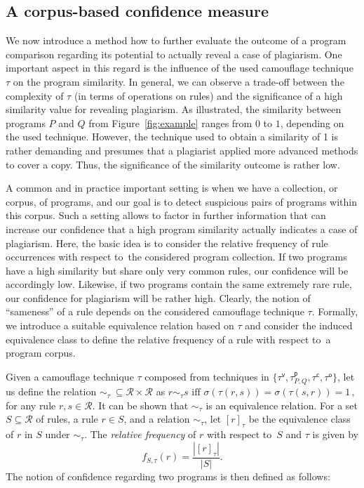\documentclass{tlp}
\newcommand{\camouv}{\tau^\mathsf{v}}
\newcommand{\camoup}{\tau^\mathsf{p}}
\newcommand{\camouc}{\tau^\mathsf{c}}
\newcommand{\camouo}{\tau^\mathsf{o}}
\newcommand{\wrt}[0]{with respect to}
\newcommand{\rules}{\mathcal{R}}
\begin{document}
\subsection{A corpus-based confidence measure}


We now introduce a method how to further evaluate the outcome of a program comparison regarding its
potential to actually reveal a  case of plagiarism.
One important aspect in this regard is the influence of the used camouflage technique $\tau$ on the program similarity.
In general,
we can observe a trade-off between the complexity of $\tau$ (in terms of operations on rules) and
the significance of a high similarity value for revealing plagiarism. 
As illustrated, the similarity between programs $P$ and $Q$ from Figure~\ref{fig:example} ranges from $0$ to $1$, depending on the used technique.
However, the technique used to obtain a similarity of 1 is rather demanding and presumes that 
a plagiarist applied more advanced methods to cover a copy.
Thus, the significance of the similarity outcome is rather low.

A common and in practice important setting  is when we have a collection, or corpus, of programs, and our goal is
to detect suspicious pairs of programs within this corpus.  Such a setting allows to factor in further information
that can increase our confidence that a high program similarity actually indicates a case of plagiarism.  
Here, the basic idea is to consider the relative frequency of rule occurrences \wrt\ the considered program collection.
If two programs have a high similarity but share only very common rules, our confidence 
will be accordingly low. 
Likewise, if two programs contain the same extremely rare rule,
our confidence for plagiarism will be rather high.
Clearly, the notion of ``sameness'' of a rule depends on the considered camouflage technique $\tau$.
Formally, we introduce a suitable equivalence relation based on $\tau$  and consider the induced equivalence class to define the relative frequency of a rule \wrt\ a program corpus.

Given a camouflage technique $\tau$   composed from techniques in $\{\camouv, \camoup_{P,Q}, \camouc, \camouo\}$, let us
define the  relation $\sim_{\tau}\ \subseteq \rules \times \rules$ as 
$
r \sim_{\tau} s \mbox{ iff }  \sigma(\tau(r,s)) =  \sigma(\tau(s,r)) =  1\,,
$
for any rule $r,s \in \rules$.
It can be shown that  $\sim_{\tau}$ is an equivalence relation.
For a set $S \subseteq \rules$ of rules, a rule $r \in S$, and a relation  $\sim_{\tau}$, let $[r]_{\tau}$ be the  equivalence class of 
$r$ in $S$ under $\sim_{\tau}$.
The \emph{relative frequency} of $r$ \wrt\ $S$ and $\tau$ is given by 
$$f_{S,\tau}(r)=\frac{|[r]_{\tau}|}{|S|}.$$
The notion of confidence regarding two programs is then defined as
follows:
\end{document}

